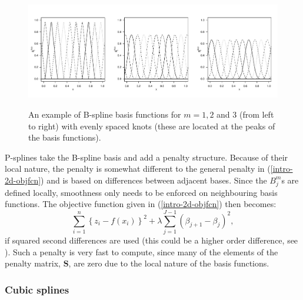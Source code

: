 \begin{figure}[tb]
\centering
\includegraphics[width=\textwidth]{intro/figs/bspline-ex.pdf}\\
\caption{An example of B-spline basis functions for $m=1, 2$ and $3$ (from left to right) with evenly spaced knots (these are located at the peaks of the basis functions).}
\label{bs-basis}
\end{figure}

P-splines take the B-spline basis and add a penalty structure. Because of their local nature, the penalty is somewhat different to the general penalty in (\ref{intro-2d-objfcn}) and is based on differences between adjacent bases. Since the $B^m_j$s are defined locally, smoothness only needs to be enforced on neighbouring basis functions. The objective function given in (\ref{intro-2d-objfcn}) then becomes:
\begin{equation*}
\sum_{i=1}^n \left \{ z_i - f(x_i) \right \}^2 +  \lambda \sum_{j=1}^{J-1} (\beta_{j+1} - \beta_j)^2,
\end{equation*}
if squared second differences are used (this could be a higher order difference, see \cite{eilersmarx96}). Such a penalty is very fast to compute, since many of the elements of the penalty matrix, $\mathbf{S}$, are zero due to the local nature of the basis functions.


\subsubsection{Cubic splines}
\label{intro-cubic}


